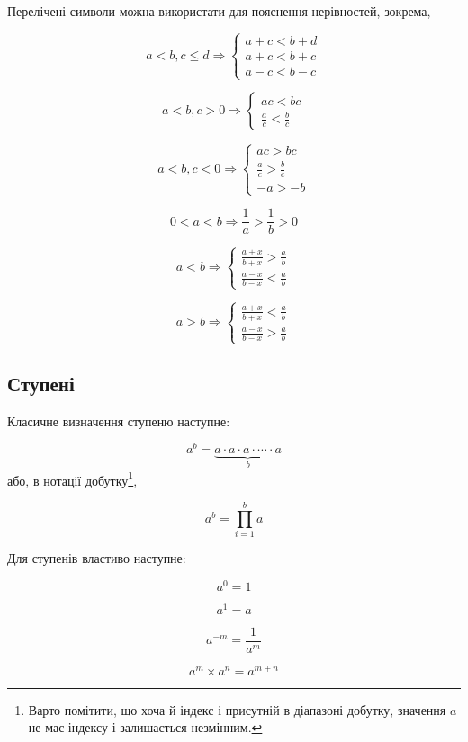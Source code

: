 \documentclass[
  11pt,
]{book}
\begin{document}
Перелічені символи можна використати для пояснення нерівностей, зокрема,

\[a < b, c \leq d \Rightarrow \begin{cases}
a + c < b + d\\
a + c < b + c\\
a - c < b - c
\end{cases}\]

\[a < b, c > 0 \Rightarrow \begin{cases}
ac < bc\\
\frac{a}{c} < \frac{b}{c}
\end{cases}\]

\[a < b, c < 0 \Rightarrow \begin{cases}
ac > bc\\
\frac{a}{c} > \frac{b}{c}\\
-a > -b
\end{cases}\]

\[0 < a < b\Rightarrow \frac{1}{a} > \frac{1}{b} > 0\]

\[a < b\Rightarrow \begin{cases}
\frac{a+x}{b+x} > \frac{a}{b} \\
\frac{a-x}{b-x} < \frac{a}{b}
\end{cases}\]

\[a > b\Rightarrow \begin{cases}
\frac{a+x}{b+x} < \frac{a}{b} \\
\frac{a-x}{b-x} > \frac{a}{b}
\end{cases}\]

\subsection{Ступені}\label{ux441ux442ux443ux43fux435ux43dux456}

Класичне визначення ступеню наступне:

\[a^b = \underbrace{a \cdot a \cdot a \cdot \cdots \cdot a}_b\]
або, в нотації добутку\footnote{Варто помітити, що хоча й індекс \(і\) присутній в діапазоні добутку, значення \(a\) не має індексу і залишається незмінним.},

\[a^b = \prod\limits_{i=1}^b a\]

Для ступенів властиво наступне:

\[a^0 = 1\]

\[a^1 = a\]

\[a^{-m} = \frac{1}{a^m}\]

\[a^m \times a^n = a^{m+n}\]
\end{document}
